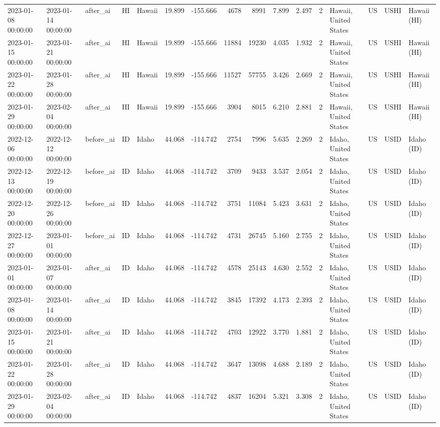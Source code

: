 \begin{tabular}{lllllrrrrrrlllll}
2023-01-08 00:00:00 & 2023-01-14 00:00:00 & after\_ai & HI & Hawaii & 19.899 & -155.666 & 4678 & 8991 & 7.899 & 2.497 & 2 & Hawaii, United States & US & USHI & Hawaii (HI) \\
2023-01-15 00:00:00 & 2023-01-21 00:00:00 & after\_ai & HI & Hawaii & 19.899 & -155.666 & 11884 & 19230 & 4.035 & 1.932 & 2 & Hawaii, United States & US & USHI & Hawaii (HI) \\
2023-01-22 00:00:00 & 2023-01-28 00:00:00 & after\_ai & HI & Hawaii & 19.899 & -155.666 & 11527 & 57755 & 3.426 & 2.669 & 2 & Hawaii, United States & US & USHI & Hawaii (HI) \\
2023-01-29 00:00:00 & 2023-02-04 00:00:00 & after\_ai & HI & Hawaii & 19.899 & -155.666 & 3904 & 8015 & 6.210 & 2.881 & 2 & Hawaii, United States & US & USHI & Hawaii (HI) \\
2022-12-06 00:00:00 & 2022-12-12 00:00:00 & before\_ai & ID & Idaho & 44.068 & -114.742 & 2754 & 7996 & 5.635 & 2.269 & 2 & Idaho, United States & US & USID & Idaho (ID) \\
2022-12-13 00:00:00 & 2022-12-19 00:00:00 & before\_ai & ID & Idaho & 44.068 & -114.742 & 3709 & 9433 & 3.537 & 2.054 & 2 & Idaho, United States & US & USID & Idaho (ID) \\
2022-12-20 00:00:00 & 2022-12-26 00:00:00 & before\_ai & ID & Idaho & 44.068 & -114.742 & 3751 & 11084 & 5.423 & 3.631 & 2 & Idaho, United States & US & USID & Idaho (ID) \\
2022-12-27 00:00:00 & 2023-01-01 00:00:00 & before\_ai & ID & Idaho & 44.068 & -114.742 & 4731 & 26745 & 5.160 & 2.755 & 2 & Idaho, United States & US & USID & Idaho (ID) \\
2023-01-01 00:00:00 & 2023-01-07 00:00:00 & after\_ai & ID & Idaho & 44.068 & -114.742 & 4578 & 25143 & 4.630 & 2.552 & 2 & Idaho, United States & US & USID & Idaho (ID) \\
2023-01-08 00:00:00 & 2023-01-14 00:00:00 & after\_ai & ID & Idaho & 44.068 & -114.742 & 3845 & 17392 & 4.173 & 2.393 & 2 & Idaho, United States & US & USID & Idaho (ID) \\
2023-01-15 00:00:00 & 2023-01-21 00:00:00 & after\_ai & ID & Idaho & 44.068 & -114.742 & 4703 & 12922 & 3.770 & 1.881 & 2 & Idaho, United States & US & USID & Idaho (ID) \\
2023-01-22 00:00:00 & 2023-01-28 00:00:00 & after\_ai & ID & Idaho & 44.068 & -114.742 & 3647 & 13098 & 4.688 & 2.189 & 2 & Idaho, United States & US & USID & Idaho (ID) \\
2023-01-29 00:00:00 & 2023-02-04 00:00:00 & after\_ai & ID & Idaho & 44.068 & -114.742 & 4837 & 16204 & 5.321 & 3.308 & 2 & Idaho, United States & US & USID & Idaho (ID) \\

\end{tabular}
